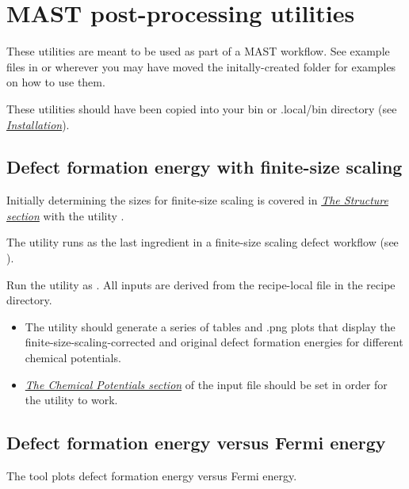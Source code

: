 \documentclass[letterpaper,10pt,english]{sphinxmanual}
\begin{document}
\chapter{MAST post-processing utilities}
\label{6_0_postprocessingtools:tools}\label{6_0_postprocessingtools::doc}\label{6_0_postprocessingtools:mast-post-processing-utilities}
These utilities are meant to be used as part of a MAST workflow.
See example files in  or wherever you may have moved the initally-created  folder for examples on how to use them.

These utilities should have been copied into your bin or .local/bin directory (see {\hyperref[1_0_installation::doc]{\emph{Installation}}}).


\section{Defect formation energy with finite-size scaling}
\label{6_0_postprocessingtools:defect-formation-energy-with-finite-size-scaling}
Initially determining the sizes for finite-size scaling is covered in {\hyperref[3_1_1_structure::doc]{\emph{The Structure section}}} with the utility .

The  utility runs as the last ingredient in a finite-size scaling defect workflow (see ).

Run the utility as . All inputs are derived from the recipe-local  file in the recipe directory.
\begin{itemize}
\item {} 
The utility should generate a series of tables and .png plots that display the finite-size-scaling-corrected and original defect formation energies for different chemical potentials.

\item {} 
{\hyperref[3_1_7_chemicalpotentials::doc]{\emph{The Chemical Potentials section}}} of the input file should be set in order for the utility to work.

\end{itemize}


\section{Defect formation energy versus Fermi energy}
\label{6_0_postprocessingtools:defect-formation-energy-versus-fermi-energy}
The  tool plots defect formation energy versus Fermi energy.
\end{document}
